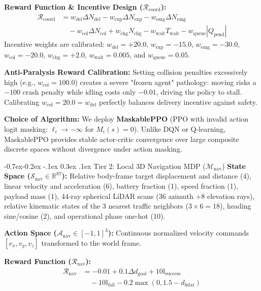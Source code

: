 \documentclass[10pt,twocolumn,letterpaper]{article}
\makeatletter
\renewcommand{\subsection}{\@startsection{subsection}{2}{\z@}%
  {-0.7ex\@plus -0.2ex \@minus -.1ex}%
  {0.3ex \@plus .1ex}%
  {\normalfont\bfseries\small}}
\makeatother
\begin{document}
\textbf{Reward Function \& Incentive Design ($\mathcal{R}_{\text{coord}}$):}
\begin{align}
    \mathcal{R}_{\text{coord}} &= w_{\text{del}} \Delta N_{\text{del}} - w_{\text{exp}} \Delta N_{\text{exp}} - w_{\text{emg}} \Delta N_{\text{emg}} \nonumber \\
    &\quad - w_{\text{col}} \Delta N_{\text{col}} + w_{\text{chg}} N_{\text{chg}} - w_{\text{wait}} T_{\text{wait}} - w_{\text{queue}} |Q_{\text{pend}}|
\end{align}
Incentive weights are calibrated: $w_{\text{del}} = +20.0$, $w_{\text{exp}} = -15.0$, $w_{\text{emg}} = -30.0$, $w_{\text{col}} = -20.0$, $w_{\text{chg}} = +2.0$, $w_{\text{wait}} = 0.005$, and $w_{\text{queue}} = 0.05$. 

\textbf{Anti-Paralysis Reward Calibration:} Setting collision penalties excessively high (e.g., $w_{\text{col}} = 100.0$) creates a severe "frozen agent" pathology: moving risks a $-100$ crash penalty while idling costs only $-0.01$, driving the policy to stall. Calibrating $w_{\text{col}} = 20.0 = w_{\text{del}}$ perfectly balances delivery incentive against safety.

\textbf{Choice of Algorithm:} We deploy \textbf{MaskablePPO} (PPO with invalid action logit masking: $\ell_i \to -\infty$ for $M_i(s)=0$). Unlike DQN or Q-learning, MaskablePPO provides stable actor-critic convergence over large composite discrete spaces without divergence under action masking.

\subsection{Tier 2: Local 3D Navigation MDP (\texorpdfstring{$\mathcal{M}_{\text{nav}}$}{M\_nav})}
\textbf{State Space ($\mathcal{S}_{\text{nav}} \in \mathbb{R}^{87}$):} Relative body-frame target displacement and distance (4), linear velocity and acceleration (6), battery fraction (1), speed fraction (1), payload mass (1), 44-ray spherical LiDAR scans (36 azimuth $+ 8$ elevation rays), relative kinematic states of the 3 nearest traffic neighbors ($3 \times 6 = 18$), heading sine/cosine (2), and operational phase one-hot (10).

\textbf{Action Space ($\mathcal{A}_{\text{nav}} \in [-1, 1]^3$):} Continuous normalized velocity commands $[v_x, v_y, v_z]$ transformed to the world frame.

\textbf{Reward Function ($\mathcal{R}_{\text{nav}}$):}
\begin{align}
    \mathcal{R}_{\text{nav}} &= -0.01 + 0.1 \Delta d_{\text{goal}} + 10 \mathbb{I}_{\text{success}} \nonumber \\
    &\quad - 10 \mathbb{I}_{\text{fail}} - 0.2 \max(0, 1.5 - d_{\text{lidar}})
\end{align}
\end{document}
